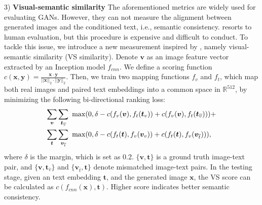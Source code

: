 \documentclass[10pt,twocolumn,letterpaper]{article}
\begin{document}
3) \textbf{Visual-semantic similarity} The aforementioned metrics are widely used for evaluating GANs. However, they can not measure the alignment between generated images and the conditioned text, i.e., semantic consistency. \cite{han2017stackgan} resorts to human evaluation, but this procedure is expensive and difficult to conduct.
To tackle this issue, we introduce a new measurement inspired by \cite{vsemb}, namely visual-semantic similarity (VS similarity).
Denote $\bm{v}$ as an image feature vector extracted by an Inception model $f_{cnn}$.
We define a scoring function $c(\bm{x}, \bm{y})=\frac{\bm{x}\cdot \bm{y}}{||\bm{x}||_2\cdot ||\bm{y}||_2}$. 
Then, we train two mapping functions $f_v$ and $f_t$, which map both real images and paired text embeddings into a common space in $\mathbb{R}^{512}$, by minimizing the following bi-directional ranking loss:
\begin{equation}\vspace{-.2cm}
\begin{split}
  \sum_{ \bm{v} }\sum_{ \bm{t}_{\overline{v}} }~ &\max( 0, \delta  - c(f_v(\bm{v}), f_t( \bm{t}_{{v}}) )+ c(f_v(\bm{v}), f_t( \bm{t}_{\overline{v}}) )     ) +\\
   \sum_{ \bm{t} }\sum_{ \bm{v}_{\overline{t}} }~ &\max( 0,  \delta  - c(f_t(\bm{t}), f_v( \bm{v}_{{v}} )) +  c(f_t(\bm{t}), f_v( \bm{v}_{\overline{t}} ))  ),
\end{split}
\vspace{-.2cm}
\end{equation}
where $\delta$ is the margin, which is set as 0.2. $\{\bm{v}, \bm{t}\}$ is a ground truth image-text pair, and $\{\bm v, \bm t_{\overline{v}} \}$ and $\{ \bm v_{\overline{t}}, \bm{t} \}$ denote mismatched image-text pairs. In the testing stage, given an text embedding $\bm{t}$, and the generated image $\bm{x}$, the VS score can be calculated as $c(f_{cnn}(\bm{x}), \bm{t})$. Higher score indicates better semantic consistency.
\end{document}
